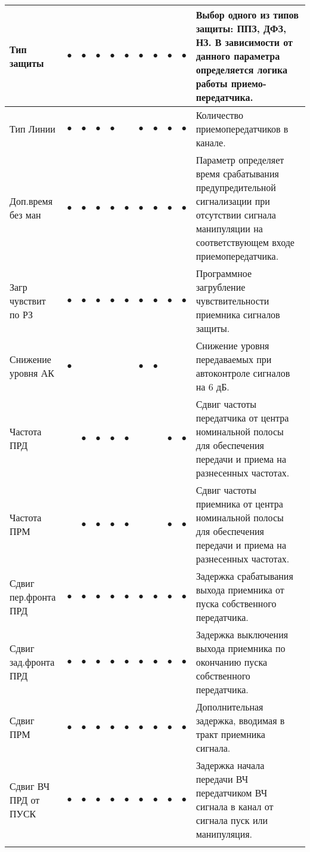 \begin{tabularx}{\linewidth}{| M{4.6cm} |*{9}{p{0.3cm} |} m{5.8cm} |}
	Тип защиты 			& $\bullet$ & $\bullet$ & $\bullet$ & $\bullet$ & $\bullet$ & $\bullet$ & $\bullet$ & $\bullet$ & $\bullet$ & Выбор одного из типов защиты: ППЗ, ДФЗ, НЗ. В зависимости от данного параметра определяется логика работы приемо-передатчика. \tabularnewline \hline
	Тип Линии			& $\bullet$ & $\bullet$ & $\bullet$ & $\bullet$ &   & $\bullet$ & $\bullet$ & $\bullet$ & $\bullet$ & Количество приемопередатчиков в канале. \tabularnewline \hline
	Доп.время без ман	& $\bullet$ & $\bullet$ & $\bullet$ & $\bullet$ & $\bullet$ & $\bullet$ & $\bullet$ & $\bullet$ & $\bullet$ & Параметр определяет время срабатывания предупредительной сигнализации при отсутствии сигнала манипуляции на соответствующем входе приемопередатчика. \tabularnewline \hline
	Загр чувствит по РЗ & $\bullet$ & $\bullet$ & $\bullet$ & $\bullet$ & $\bullet$ & $\bullet$ & $\bullet$ & $\bullet$ & $\bullet$ & Программное загрубление чувствительности приемника сигналов защиты. \tabularnewline \hline
	Снижение уровня АК  & $\bullet$ &   &   &   &   & $\bullet$ & $\bullet$ &   &   & Снижение уровня передаваемых при автоконтроле сигналов на 6 дБ. \tabularnewline \hline
	Частота ПРД			&   & $\bullet$ & $\bullet$ & $\bullet$ & $\bullet$ &   &   & $\bullet$ & $\bullet$ & Сдвиг частоты передатчика от центра номинальной полосы для обеспечения передачи и приема на разнесенных частотах. \tabularnewline \hline
	Частота ПРМ			&   & $\bullet$ & $\bullet$ & $\bullet$ & $\bullet$ &   &   & $\bullet$ & $\bullet$ & Сдвиг частоты приемника от центра номинальной полосы для обеспечения передачи и приема на разнесенных частотах. \tabularnewline \hline
	Сдвиг пер.фронта ПРД & $\bullet$ & $\bullet$ & $\bullet$ & $\bullet$ & $\bullet$ & $\bullet$ & $\bullet$ & $\bullet$ & $\bullet$ & Задержка срабатывания выхода приемника от пуска собственного передатчика. \tabularnewline \hline
	Сдвиг зад.фронта ПРД & $\bullet$ & $\bullet$ & $\bullet$ & $\bullet$ & $\bullet$ & $\bullet$ & $\bullet$ & $\bullet$ & $\bullet$ & Задержка выключения выхода приемника по окончанию пуска собственного передатчика. \tabularnewline \hline
	Сдвиг ПРМ			& $\bullet$ & $\bullet$ & $\bullet$ & $\bullet$ & $\bullet$ & $\bullet$ & $\bullet$ & $\bullet$ & $\bullet$ & Дополнительная задержка, вводимая в тракт приемника сигнала. \tabularnewline \hline		
	Сдвиг ВЧ ПРД от ПУСК & $\bullet$ & $\bullet$ & $\bullet$ & $\bullet$ & $\bullet$ & $\bullet$ & $\bullet$ & $\bullet$ & $\bullet$ & Задержка начала передачи ВЧ передатчиком ВЧ сигнала в канал от сигнала пуск или манипуляция. \tabularnewline 

    \lasthline
\end{tabularx}